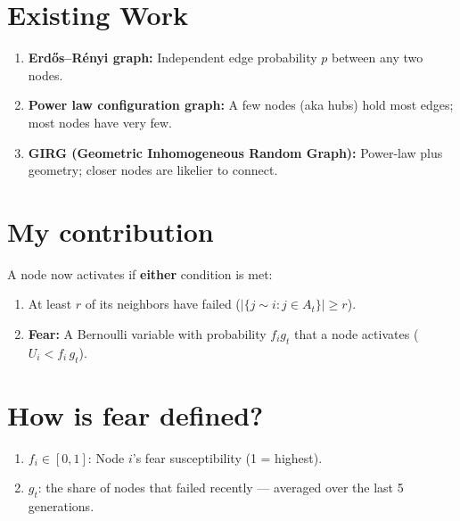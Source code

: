 \documentclass[fleqn]{betterposter}
\begin{document}
{\section{Existing Work}
\vspace{-0.3em}
\begin{enumerate}
    \item \textbf{Erd\H{o}s--R\'enyi graph:} Independent edge probability $p$ between any two nodes.
    \item \textbf{Power law configuration graph:} A few nodes (aka hubs) hold most edges; most nodes have very few.
    \item \textbf{GIRG (Geometric Inhomogeneous Random Graph):} Power-law plus geometry; closer nodes are likelier to connect.
\end{enumerate}

\vspace{-1.5em}

\section{My contribution}

\vspace{-0.3em}
A node now activates if \textbf{either}
condition is met:
\vspace{0.2em}
\begin{enumerate}[leftmargin=*, nosep, itemsep=0.3em]

\item {}
At least $r$ of its neighbors have failed ($|\{j \sim i : j \in A_t\}| \geq r$).

\item \textbf{Fear:}
A Bernoulli variable with probability $f_ig_t$ that a node activates ($U_i < f_i\, g_t$).

\end{enumerate}

\vspace{-1.2em}
\section{How is fear defined?}
\vspace{-0.3em}
\begin{enumerate}
    \item $f_i \in [0,1]$: Node $i$'s fear susceptibility (1 = highest).
    \item $g_t$: the share of nodes that failed recently --- averaged over
    the last 5 generations.
\end{enumerate}


}
\end{document}
